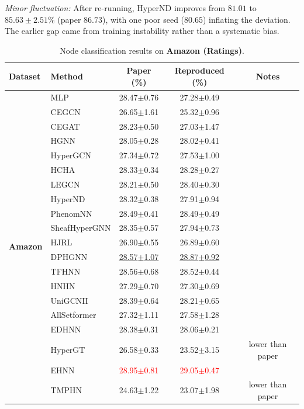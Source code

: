 \documentclass[11pt,a4paper]{article}
\begin{document}
\noindent\textit{Minor fluctuation:} After re-running, HyperND improves from $81.01$ to $85.63\pm2.51\%$ (paper $86.73$), with one poor seed ($80.65$) inflating the deviation. The earlier gap came from training instability rather than a systematic bias.



\begin{table}[H]
	\centering\small
	\begin{tabular}{llccc}
		\toprule
		Dataset & Method & Paper (\%) & Reproduced (\%) & Notes \\
		\midrule
		\multirow{20}{*}{\textbf{Amazon}} & MLP               & 28.47$\pm$0.76   & 27.28$\pm$0.49   &  \\
		 & CEGCN             & 26.65$\pm$1.61   & 25.32$\pm$0.96   &  \\
		 & CEGAT             & 28.23$\pm$0.50   & 27.03$\pm$1.47   &  \\
		 & HGNN              & 28.05$\pm$0.28   & 28.02$\pm$0.41   &  \\
		 & HyperGCN          & 27.34$\pm$0.72   & 27.53$\pm$1.00   &  \\
		 & HCHA              & 28.33$\pm$0.34   & 28.28$\pm$0.27   &  \\
		 & LEGCN             & 28.21$\pm$0.50   & 28.40$\pm$0.30   &  \\
		 & HyperND           & 28.32$\pm$0.38   & 27.91$\pm$0.94   &  \\
		 & PhenomNN          & 28.49$\pm$0.41   & 28.49$\pm$0.49   &  \\
		 & SheafHyperGNN     & 28.35$\pm$0.57   & 27.94$\pm$0.73   &  \\
		 & HJRL              & 26.90$\pm$0.55   & 26.89$\pm$0.60   &  \\
		 & DPHGNN            & \underline{28.57$\pm$1.07}   & \underline{28.87$\pm$0.92}   &  \\
		 & TFHNN             & 28.56$\pm$0.68   & 28.52$\pm$0.44   &  \\
		 & HNHN              & 27.29$\pm$0.70   & 27.30$\pm$0.69   &  \\
		 & UniGCNII          & 28.39$\pm$0.64   & 28.21$\pm$0.65   &  \\
		 & AllSetformer      & 27.32$\pm$1.11   & 27.58$\pm$1.28   &  \\
		 & EDHNN             & 28.38$\pm$0.31   & 28.06$\pm$0.21   &  \\
		 & HyperGT           & 26.58$\pm$0.33   & 23.52$\pm$3.15   & lower than paper \\
		 & EHNN              & \textcolor{red}{28.95$\pm$0.81}   & \textcolor{red}{29.05$\pm$0.47}   &  \\
		 & TMPHN             & 24.63$\pm$1.22   & 23.07$\pm$1.98   & lower than paper \\
		\bottomrule
	\end{tabular}
	\caption{Node classification results on \textbf{Amazon (Ratings)}.}
\end{table}
\end{document}

